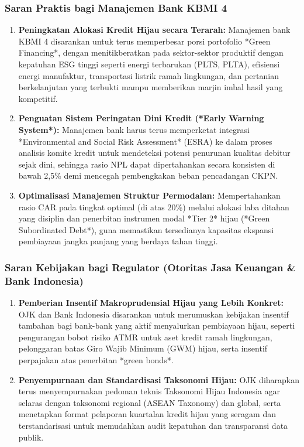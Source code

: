 \documentclass[12pt,a4paper]{article}
\numberwithin{equation}{section}
\begin{document}
\subsubsection{Saran Praktis bagi Manajemen Bank KBMI 4}
\begin{enumerate}[label=\alph*.]
  \item \textbf{Peningkatan Alokasi Kredit Hijau secara Terarah:} Manajemen bank KBMI 4 disarankan untuk terus memperbesar porsi portofolio *Green Financing*, dengan menitikberatkan pada sektor-sektor produktif dengan kepatuhan ESG tinggi seperti energi terbarukan (PLTS, PLTA), efisiensi energi manufaktur, transportasi listrik ramah lingkungan, dan pertanian berkelanjutan yang terbukti mampu memberikan marjin imbal hasil yang kompetitif.
  \item \textbf{Penguatan Sistem Peringatan Dini Kredit (*Early Warning System*):} Manajemen bank harus terus memperketat integrasi *Environmental and Social Risk Assessment* (ESRA) ke dalam proses analisis komite kredit untuk mendeteksi potensi penurunan kualitas debitur sejak dini, sehingga rasio NPL dapat dipertahankan secara konsisten di bawah 2,5\% demi mencegah pembengkakan beban pencadangan CKPN.
  \item \textbf{Optimalisasi Manajemen Struktur Permodalan:} Mempertahankan rasio CAR pada tingkat optimal (di atas 20\%) melalui alokasi laba ditahan yang disiplin dan penerbitan instrumen modal *Tier 2* hijau (*Green Subordinated Debt*), guna memastikan tersedianya kapasitas ekspansi pembiayaan jangka panjang yang berdaya tahan tinggi.
\end{enumerate}

\subsubsection{Saran Kebijakan bagi Regulator (Otoritas Jasa Keuangan \& Bank Indonesia)}
\begin{enumerate}[label=\alph*.]
  \item \textbf{Pemberian Insentif Makroprudensial Hijau yang Lebih Konkret:} OJK dan Bank Indonesia disarankan untuk merumuskan kebijakan insentif tambahan bagi bank-bank yang aktif menyalurkan pembiayaan hijau, seperti pengurangan bobot risiko ATMR untuk aset kredit ramah lingkungan, pelonggaran batas Giro Wajib Minimum (GWM) hijau, serta insentif perpajakan atas penerbitan *green bonds*.
  \item \textbf{Penyempurnaan dan Standardisasi Taksonomi Hijau:} OJK diharapkan terus menyempurnakan pedoman teknis Taksonomi Hijau Indonesia agar selaras dengan taksonomi regional (ASEAN Taxonomy) dan global, serta menetapkan format pelaporan kuartalan kredit hijau yang seragam dan terstandarisasi untuk memudahkan audit kepatuhan dan transparansi data publik.
\end{enumerate}
\end{document}
